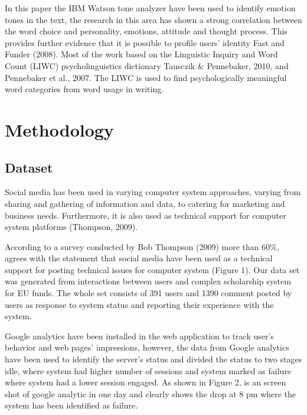 \documentclass[graybox]{svmult}
\begin{document}
In this paper the IBM Watson tone analyzer have been used to identify
emotion tones in the text, the research in this area has shown a
strong correlation between the word choice and personality, emotions,
attitude and thought process. This provides further evidence that it
is possible to profile users’ identity Fast and Funder (2008). Most of
the work based on the Linguistic Inquiry and Word Count (LIWC)
psycholinguistics dictionary Tausczik \& Pennebaker, 2010, and
Pennebaker et al., 2007. The LIWC is used to find psychologically
meaningful word categories from word usage in writing.

\section{Methodology}\label{method}

\subsection{Dataset}

Social media has been used in varying computer system approaches,
varying from sharing and gathering of information and data, to
catering for marketing and business needs. Furthermore, it is also
used as technical support for computer system platforms (Thompson,
2009). 


According to a survey conducted by Bob Thompson (2009) more than 60\%,
agrees with the statement that social media have been used as a
technical support for posting technical issues for computer system
(Figure 1). Our data set was generated from interactions between users
and complex scholarship system for EU funds. The whole set consists of
391 users and 1390 comment posted by users as response to system
status and reporting their experience with the system.

Google analytics have been installed in the web application to track
user’s behavior and web pages’ impressions, however, the data from
Google analytics have been used to identify the server’s status and
divided the status to two stages idle, where system had higher number
of sessions and system marked as failure where system had a lower
session engaged. As shown in Figure 2, is an screen shot of google
analytic in one day and clearly shows the drop at 8 pm where the
system has been identified as failure.






\end{document}
